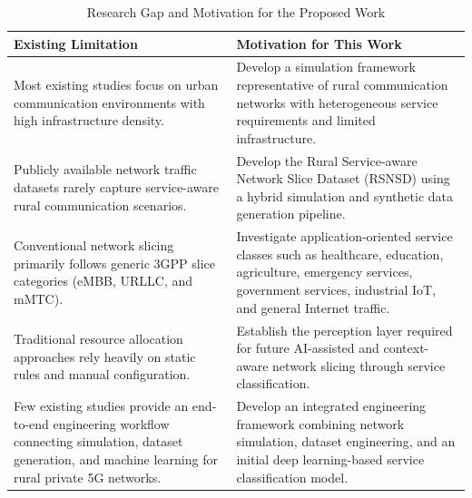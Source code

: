 \documentclass[12pt,a4paper]{report}
\begin{document}
	\begin{table}[H]
		\centering
		\caption{Research Gap and Motivation for the Proposed Work}
		\label{tab:research_gap}
		
		\begin{tabular}{|p{6.2cm}|p{6.2cm}|}
			\hline
			
			\textbf{Existing Limitation} &
			\textbf{Motivation for This Work}
			\\
			\hline
			
			Most existing studies focus on urban communication environments with high infrastructure density. &
			Develop a simulation framework representative of rural communication networks with heterogeneous service requirements and limited infrastructure.
			\\
			\hline
			
			Publicly available network traffic datasets rarely capture service-aware rural communication scenarios. &
			Develop the Rural Service-aware Network Slice Dataset (RSNSD) using a hybrid simulation and synthetic data generation pipeline.
			\\
			\hline
			
			Conventional network slicing primarily follows generic 3GPP slice categories (eMBB, URLLC, and mMTC). &
			Investigate application-oriented service classes such as healthcare, education, agriculture, emergency services, government services, industrial IoT, and general Internet traffic.
			\\
			\hline
			
			Traditional resource allocation approaches rely heavily on static rules and manual configuration. &
			Establish the perception layer required for future AI-assisted and context-aware network slicing through service classification.
			\\
			\hline
			
			Few existing studies provide an end-to-end engineering workflow connecting simulation, dataset generation, and machine learning for rural private 5G networks. &
			Develop an integrated engineering framework combining network simulation, dataset engineering, and an initial deep learning-based service classification model.
			\\
			\hline
			
		\end{tabular}
		
	\end{table}
\end{document}
